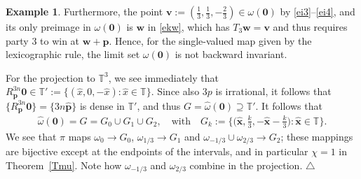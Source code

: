 \documentclass[11pt,reqno,tbtags,a4paper]{amsart}
\numberwithin{equation}{section}
\theoremstyle{plain}%
\theoremstyle{definition}
\newcommand\xqed[1]{%
    \leavevmode\unskip\penalty9999 \hbox{}\nobreak\hfill
    \quad\hbox{#1}}
\newtheorem{exampleqqq}[theorem]{Example}
\newenvironment{example}{\begin{exampleqqq}}
  {\xqed{$\triangle$}\end{exampleqqq}}
\theoremstyle{remark}
\newcommand{\refT}[1]{Theorem~\ref{#1}}
\newcommand\set[1]{\ensuremath{\{#1\}}}
\newcommand\bigset[1]{\ensuremath{\bigl\{#1\bigr\}}}
\newcommand\bigpar[1]{\bigl(#1\bigr)}
\newcommand\bbT{\mathbb T}
\newcommand\cL{{\omega}}
\newcommand\hcL{\hat{\cL}}
\newcommand\vp{\mathbf{p}}
\newcommand\hvp{\hat{\mathbf{p}}}
\newcommand\vv{\mathbf{v}}
\newcommand\vw{\mathbf{w}}
\newcommand\hvx{\hat{\mathbf{x}}}
\newcommand\hx{\hat x}
\newcommand\Rp{R_\vp}
\newcommand\0{{\boldsymbol 0}}
\newcommand\1{{\boldsymbol 1}}
\begin{document}
\begin{example}
Furthermore,
the point $\vv:=(\tfrac13,\tfrac13,-\tfrac23)\in\cL(\0)$ 
by \eqref{ei3}--\eqref{ei4},
and its only  preimage in $\cL(\0)$
is $\vw$ in \eqref{ekw}, which has $T_3\vw=\vv$ and thus
requires party 3 to win at $\vw+\vp$.
Hence,
for the single-valued map given by the lexicographic rule, 
the limit set $\cL(\0)$ is not backward invariant.

%
For the projection to $\bbT^3$, we see immediately  that 
$\Rp^{3n}\0\in \bbT':=\set{(\hx,0,-\hx):\hx\in\bbT}$.
Since also $3p$ is irrational, it follows that
$\set{\Rp^{3n}\0}=\set{3n\hvp}$ is dense in $\bbT'$, and thus 
$G=\hcL(\0)\supseteq \bbT'$. It follows that
\begin{align}
  \hcL(\0)=G=G_0\cup G_1\cup G_2,
\quad\text{with}\quad 
%
G_k:=\bigset{\bigpar{\hvx,\tfrac{k}{3},-\hvx-\tfrac{k}{3}}:\hvx\in\bbT}.
\end{align}
We see that $\pi$ maps $\cL_0\to G_0$, $\cL_{1/3}\to G_1$ and 
$\cL_{-1/3}\cup\cL_{2/3}\to G_2$; these mappings are bijective except at the
  endpoints of the intervals, and in particular $\chi=1$ in \refT{Tmu}.
Note how $\cL_{-1/3}$ and $\cL_{2/3}$ combine in the projection.
\end{example}
\end{document}

